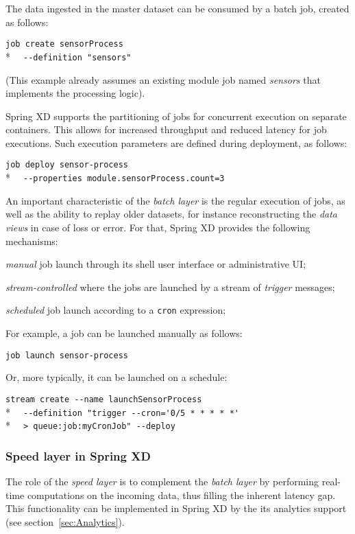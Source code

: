 The data ingested in the master dataset can be consumed by a batch job,
created as follows:

\verb;job create sensorProcess;\\*
\verb;  --definition "sensors";

(This example already assumes an existing module job named \emph{sensors} that
implements the processing logic).

Spring XD supports the partitioning of jobs for concurrent execution on
separate containers. This allows for increased throughput and reduced latency
for job executions. Such execution parameters are defined during deployment,
as follows:

\verb;job deploy sensor-process;\\*
\verb;  --properties module.sensorProcess.count=3;

An important characteristic of the \emph{batch layer} is the regular
execution of jobs, as well as the ability to replay older datasets, for
instance reconstructing the \emph{data views} in case of loss or error.
For that, Spring XD provides the following mechanisms:

\begin{itemize*}
\item \emph{manual} job launch through its shell user interface or 
administrative UI;
\item \emph{stream-controlled} where the jobs are launched by a stream of 
\emph{trigger} messages;
\item \emph{scheduled} job launch according to a \texttt{cron} expression;
\end{itemize*}

For example, a job can be launched manually as follows:

\verb;job launch sensor-process;

Or, more typically, it can be launched on a schedule:

\verb;stream create --name launchSensorProcess;\\*
\verb;  --definition "trigger --cron='0/5 * * * * *';\\* 
\verb;  > queue:job:myCronJob" --deploy;

\subsubsection {Speed layer in Spring XD}

The role of the \emph{speed layer} is to complement the \emph{batch layer} 
by performing real-time computations on the incoming data, thus filling the 
inherent latency gap. This functionality can be implemented in Spring XD by 
the its analytics support (see section~\ref{sec:Analytics}).


